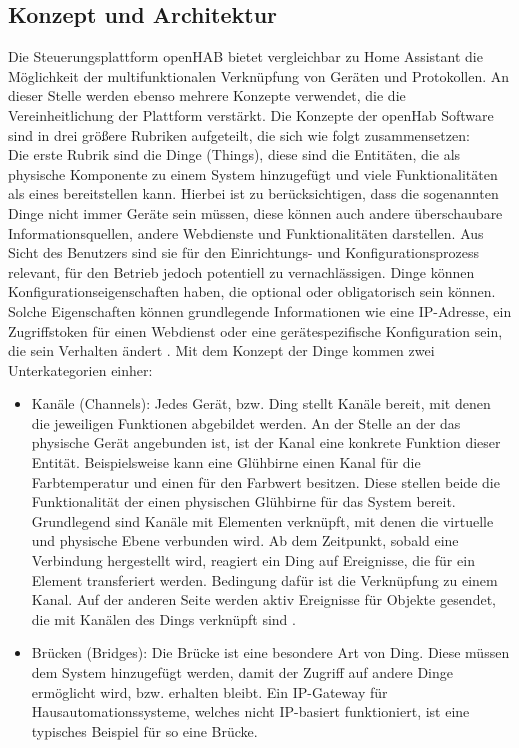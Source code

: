 \subsection{Konzept und Architektur}
    Die Steuerungsplattform openHAB bietet vergleichbar zu Home Assistant die Möglichkeit der multifunktionalen Verknüpfung von 
    Geräten und Protokollen. An dieser Stelle werden ebenso mehrere Konzepte verwendet, die die Vereinheitlichung der Plattform 
    verstärkt. Die Konzepte der openHab Software sind in drei größere Rubriken aufgeteilt, die sich wie folgt zusammensetzen:
    \\
    \linebreak
    Die erste Rubrik sind die Dinge (Things), diese sind die Entitäten, die als physische Komponente zu einem System hinzugefügt 
    und viele Funktionalitäten als eines bereitstellen kann. Hierbei ist zu berücksichtigen, dass die sogenannten Dinge nicht 
    immer Geräte sein müssen, diese können auch andere überschaubare Informationsquellen, andere Webdienste und Funktionalitäten 
    darstellen. Aus Sicht des Benutzers sind sie für den Einrichtungs- und Konfigurationsprozess relevant, für den Betrieb 
    jedoch potentiell zu vernachlässigen. Dinge können Konfigurationseigenschaften haben, die optional oder obligatorisch sein 
    können. Solche Eigenschaften können grundlegende Informationen wie eine IP-Adresse, ein Zugriffstoken für einen Webdienst 
    oder eine gerätespezifische Konfiguration sein, die sein Verhalten ändert \cite{openHAB-article}. Mit dem Konzept der Dinge 
    kommen zwei Unterkategorien einher:
    \begin{itemize}
        \item Kanäle (Channels): Jedes Gerät, bzw. Ding stellt Kanäle bereit, mit denen die jeweiligen Funktionen abgebildet werden. 
        An der Stelle an der das physische Gerät angebunden ist, ist der Kanal eine konkrete Funktion dieser Entität. Beispielsweise 
        kann eine Glühbirne einen Kanal für die Farbtemperatur und einen für den Farbwert besitzen. Diese stellen beide die 
        Funktionalität der einen physischen Glühbirne für das System bereit. Grundlegend sind Kanäle mit Elementen verknüpft, mit denen 
        die virtuelle und physische Ebene verbunden wird. Ab dem Zeitpunkt, sobald eine Verbindung hergestellt wird, reagiert ein Ding 
        auf Ereignisse, die für ein Element transferiert werden. Bedingung dafür ist die Verknüpfung zu einem Kanal. Auf der anderen 
        Seite werden aktiv Ereignisse für Objekte gesendet, die mit Kanälen des Dings verknüpft sind \cite{openHAB-article}.
        \item Brücken (Bridges): Die Brücke ist eine besondere Art von Ding. Diese müssen dem System hinzugefügt werden, damit der 
        Zugriff auf andere Dinge ermöglicht wird, bzw. erhalten bleibt. Ein IP-Gateway für Hausautomationssysteme, welches nicht 
        IP-basiert funktioniert, ist eine typisches Beispiel für so eine Brücke.
    \end{itemize}
